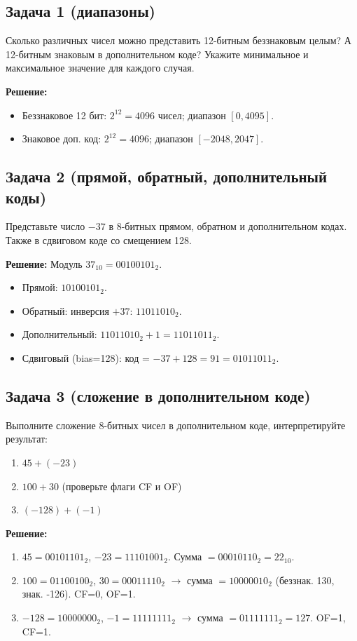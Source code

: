 \documentclass[a4paper,14pt]{report}
\begin{document}
\subsection*{Задача 1 (диапазоны)}
Сколько различных чисел можно представить 12-битным беззнаковым целым? А 12-битным знаковым в дополнительном коде? Укажите минимальное и максимальное значение для каждого случая.

\textbf{Решение:}
\begin{itemize}
    \item Беззнаковое 12 бит: $2^{12} = 4096$ чисел; диапазон $[0, 4095]$.
    \item Знаковое доп. код: $2^{12} = 4096$; диапазон $[-2048, 2047]$.
\end{itemize}

\subsection*{Задача 2 (прямой, обратный, дополнительный коды)}
Представьте число $-37$ в 8-битных прямом, обратном и дополнительном кодах. Также в сдвиговом коде со смещением 128.

\textbf{Решение:}
Модуль $37_{10} = 00100101_2$.
\begin{itemize}
    \item Прямой: $10100101_2$.
    \item Обратный: инверсия $+37$: $11011010_2$.
    \item Дополнительный: $11011010_2 + 1 = 11011011_2$.
    \item Сдвиговый (bias=128): код = $-37+128=91 = 01011011_2$.
\end{itemize}

\subsection*{Задача 3 (сложение в дополнительном коде)}
Выполните сложение 8-битных чисел в дополнительном коде, интерпретируйте результат:
\begin{enumerate}
    \item[a)] $45 + (-23)$
    \item[b)] $100 + 30$ (проверьте флаги CF и OF)
    \item[c)] $(-128) + (-1)$
\end{enumerate}

\textbf{Решение:}
\begin{enumerate}
    \item[a)] $45=00101101_2$, $-23=11101001_2$. Сумма $=00010110_2=22_{10}$.
    \item[b)] $100=01100100_2$, $30=00011110_2$ $\to$ сумма $=10000010_2$ (беззнак. 130, знак. -126). CF=0, OF=1.
    \item[c)] $-128=10000000_2$, $-1=11111111_2$ $\to$ сумма $=01111111_2=127$. OF=1, CF=1.
\end{enumerate}
\end{document}
